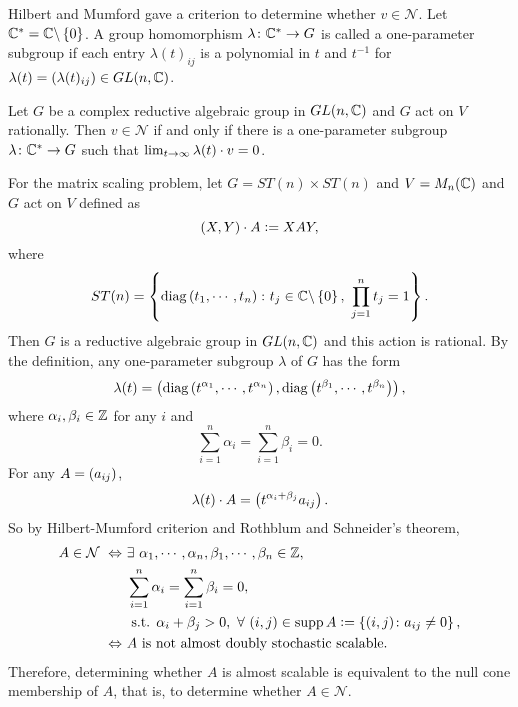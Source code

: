 \documentclass[suri,pdfbookmark]{engsuribt} %
\begin{document}
  Hilbert \cite{key2} and Mumford \cite{key3} gave a criterion to determine whether $v \in \mathcal{N}$. Let $\mathbb{C}^* = \mathbb{C} \backslash \left\{0\right\}$. A group homomorphism $\lambda \colon \mathbb{C}^* \rightarrow G$ is called a one-parameter subgroup if each entry $\lambda(t)_{ij}$ is a polynomial in $t$ and $t^{-1}$ for $\lambda(t) = \left(\lambda(t)_{ij}\right) \in GL(n,\mathbb{C})$.
  \begin{thm}
    Let $G$ be a complex reductive algebraic group in $GL(n,\mathbb{C})$ and $G$ act on $V$ rationally. Then $v \in \mathcal{N}$ if and only if there is a one-parameter subgroup $\lambda \colon \mathbb{C}^* \rightarrow G$ such that $\lim_{t \rightarrow \infty}\lambda(t) \cdot v = 0$. 
  \end{thm}

  For the matrix scaling problem, let $G = ST(n)\times ST(n)$ and $V = M_n(\mathbb{C})$ and $G$ act on $V$ defined as
  \begin{equation*}
    (X,Y) \cdot A \vcentcolon= XAY,
  \end{equation*}
  where
  \begin{equation*}
    ST(n) = \left\{\operatorname{diag}\left(t_1,\cdots,t_n\right) \colon t_j \in \mathbb{C} \backslash \left\{0\right\},~\prod_{j=1}^n t_j = 1\right\}.
  \end{equation*}
  Then $G$ is a reductive algebraic group in $GL(n,\mathbb{C})$ and this action is rational. By the definition, any one-parameter subgroup $\lambda$ of $G$ has the form
  \begin{equation*}
    \lambda(t) = \left(\operatorname{diag}\left(t^{\alpha_1},\cdots,t^{\alpha_n}\right),\operatorname{diag}\left(t^{\beta_1},\cdots,t^{\beta_n}\right)\right),
  \end{equation*}
  where $\alpha_i,\beta_i \in \mathbb{Z}$ for any $i$ and
  \begin{equation*}
    \sum_{i=1}^n \alpha_i = \sum_{i=1}^n \beta_i = 0.
  \end{equation*}
  For any $A =\left(a_{ij}\right)$, 
  \begin{equation*}
    \lambda(t) \cdot A = \left(t^{\alpha_i+\beta_j}a_{ij}\right).
  \end{equation*}
  So by Hilbert-Mumford criterion and Rothblum and Schneider's theorem,
  \begin{equation*}
    \begin{split}
      A \in \mathcal{N}~\Leftrightarrow~&\exists~\alpha_1,\cdots,\alpha_n,\beta_1,\cdots,\beta_n \in \mathbb{Z}, \\
      & \sum_{i=1}^n \alpha_i = \sum_{i=1}^n \beta_i = 0, \\
      & \text{ s.t. }\alpha_i+\beta_j > 0,~\forall~ (i,j) \in \operatorname{supp} A \vcentcolon= \left\{(i,j) \colon a_{ij} \neq 0\right\},\\
      \Leftrightarrow~& A \text{ is not almost doubly stochastic scalable}. 
    \end{split}
  \end{equation*}
  Therefore, determining whether $A$ is almost scalable is equivalent to the null cone membership of $A$, that is, to determine whether $A \in \mathcal{N}$.
\end{document}
